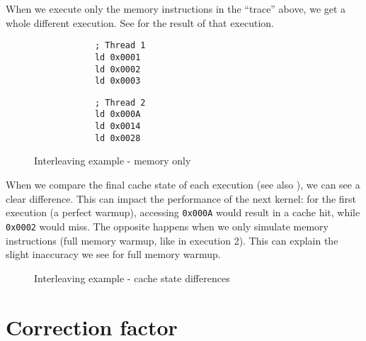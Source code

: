 When we execute only the memory instructions in the ``trace'' above, we get a whole different execution.
See  for the result of that execution.
\begin{figure}[ht]
    \centering
    \begin{minipage}[!]{0.45\textwidth}
        \begin{verbatim}
            ; Thread 1
            ld 0x0001
            ld 0x0002
            ld 0x0003
        \end{verbatim}
    \end{minipage}
    \begin{minipage}[!]{0.45\textwidth}
        \begin{verbatim}
            ; Thread 2
            ld 0x000A
            ld 0x0014
            ld 0x0028
        \end{verbatim}
    \end{minipage}
    \caption{Interleaving example - memory only}
    \label{fig:example2b}
\end{figure}

When we compare the final cache state of each execution (see also ), we can see a clear difference.
This can impact the performance of the next kernel: for the first execution (a perfect warmup), accessing \verb|0x000A| would result in a cache hit, while \verb|0x0002| would miss.
The opposite happens when we only simulate memory instructions (full memory warmup, like in execution 2).
This can explain the slight inaccuracy we see for full memory warmup.
\begin{figure}[h]
    \centering
    \caption{Interleaving example - cache state differences}
    \label{fig:example2_final}
\end{figure}

\FloatBarrier
\section{Correction factor}\label{sec:correction-factor}

